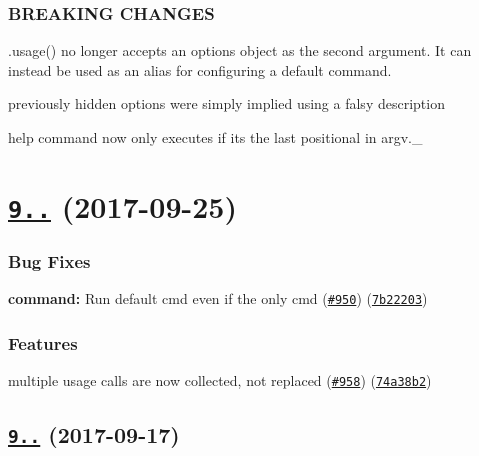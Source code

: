 \subsubsection*{B\+R\+E\+A\+K\+I\+NG C\+H\+A\+N\+G\+ES}


\begin{DoxyItemize}
\item .usage() no longer accepts an options object as the second argument. It can instead be used as an alias for configuring a default command.
\item previously hidden options were simply implied using a falsy description
\item help command now only executes if it\textquotesingle{}s the last positional in argv.\+\_\+
\end{DoxyItemize}

\label{_9.1.0}%
 \section*{\href{https://github.com/yargs/yargs/compare/v9.0.1...v9.1.0}{\tt 9..} (2017-\/09-\/25)}

\subsubsection*{Bug Fixes}


\begin{DoxyItemize}
\item {\bfseries command\+:} Run default cmd even if the only cmd (\href{https://github.com/yargs/yargs/issues/950}{\tt \#950}) (\href{https://github.com/yargs/yargs/commit/7b22203}{\tt 7b22203})
\end{DoxyItemize}

\subsubsection*{Features}


\begin{DoxyItemize}
\item multiple usage calls are now collected, not replaced (\href{https://github.com/yargs/yargs/issues/958}{\tt \#958}) (\href{https://github.com/yargs/yargs/commit/74a38b2}{\tt 74a38b2})
\end{DoxyItemize}

\label{_9.0.1}%
 \subsection*{\href{https://github.com/yargs/yargs/compare/v9.0.0...v9.0.1}{\tt 9..} (2017-\/09-\/17)}

